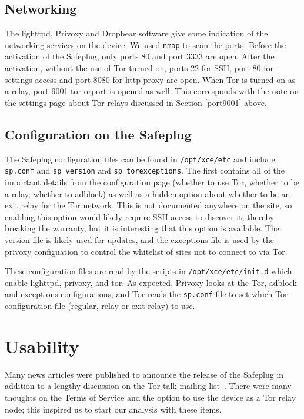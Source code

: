 \documentclass[conference]{IEEEtran}
\begin{document}
\subsection{Networking}
The lighttpd, Privoxy and Dropbear software give some indication of the networking services on the device.  We used \texttt{nmap} to scan the ports.  Before the activation of the Safeplug, only ports 80 and port 3333 are open.  After the activation, without the use of Tor turned on, ports 22 for SSH, port 80 for settings access and port 8080 for http-proxy are open.  When Tor is turned on as a relay, port 9001 tor-orport is opened as well.  This corresponds with the note on the settings page about Tor relays discussed in Section \ref{port9001} above.
    
\subsection{Configuration on the Safeplug}
\label{spconfig}
The Safeplug configuration files can be found in \verb!/opt/xce/etc! and include \verb!sp.conf! and \verb!sp_version! and \verb!sp_torexceptions!.  The first contains all of the important details from the configuration page (whether to use Tor, whether to be a relay, whether to adblock) as well as a hidden option about whether to be an exit relay for the Tor network.  This is not documented anywhere on the site, so enabling this option would likely require SSH access to discover it, thereby breaking the warranty, but it is interesting that this option is available.  The version file is likely used for updates, and the exceptions file is used by the privoxy configuation to control the whitelist of sites not to connect to via Tor.

These configuration files are read by the scripts in \verb!/opt/xce/etc/init.d! which enable lighttpd, privoxy, and tor.  As expected, Privoxy looks at the Tor, adblock and exceptions configurations, and Tor reads the \verb!sp.conf! file to set which Tor configuration file (regular, relay or exit relay) to use.

\section{Usability}
Many news articles were published to announce the release of the Safeplug in addition to a lengthy discussion on the Tor-talk mailing list~\cite{tormailinglist}.  There were many thoughts on the Terms of Service and the option to use the device as a Tor relay node; this inspired us to start our analysis with these items.  
\end{document}
